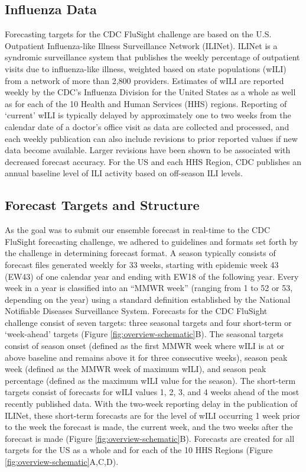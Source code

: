 \documentclass{article}\usepackage[]{graphicx}\usepackage[]{color}
\begin{document}
\subsection{Influenza Data}
Forecasting targets for the CDC FluSight challenge are based on the U.S. Outpatient Influenza-like Illness Surveillance Network (ILINet). 
ILINet is a syndromic surveillance system that publishes the weekly percentage of outpatient visits due to influenza-like illness, weighted based on state populations (wILI) from a network of more than 2,800 providers. 
Estimates of wILI are reported weekly by the CDC's Influenza Division for the United States as a whole as well as for each of the 10 Health and Human Services (HHS) regions. 
Reporting of `current' wILI is typically delayed by approximately one to two weeks from the calendar date of a doctor's office visit as data are collected and processed, and each weekly publication can also include revisions to prior reported values if new data become available. 
Larger revisions have been shown to be associated with decreased forecast accuracy.\cite{reich2019collaborative}
For the US and each HHS Region, CDC publishes an annual baseline level of ILI activity based on off-season ILI levels.\cite{surv2017} 

\subsection{Forecast Targets and Structure}
As the goal was to submit our ensemble forecast in real-time to the CDC FluSight forecasting challenge, we adhered to guidelines and formats set forth by the challenge in determining forecast format.
A season typically consists of forecast files generated weekly for 33 weeks, starting with epidemic week 43 (EW43) of one calendar year and ending with EW18 of the following year.
Every week in a year is classified into an ``MMWR week'' (ranging from 1 to 52 or 53, depending on the year) using a standard definition established by the National Notifiable Diseases Surveillance System.\cite{NewMexicoDepartmentofHealth,Niemi2015,Tushar2018}
Forecasts for the CDC FluSight challenge consist of seven targets: three seasonal targets and four short-term or `week-ahead' targets (Figure \ref{fig:overview-schematic}B). 
The seasonal targets consist of season onset (defined as the first MMWR week where wILI is at or above baseline and remains above it for three consecutive weeks), season peak week (defined as the MMWR week of maximum wILI), and season peak percentage (defined as the maximum wILI value for the season). The short-term targets consist of forecasts for wILI values 1, 2, 3, and 4 weeks ahead of the most recently published data. With the two-week reporting delay in the publication of ILINet, these short-term forecasts are for the level of wILI occurring 1 week prior to the week the forecast is made, the current week, and the two weeks after the forecast is made (Figure \ref{fig:overview-schematic}B). Forecasts are created for all targets for the US as a whole and for each of the 10 HHS Regions (Figure \ref{fig:overview-schematic}A,C,D).
\end{document}
